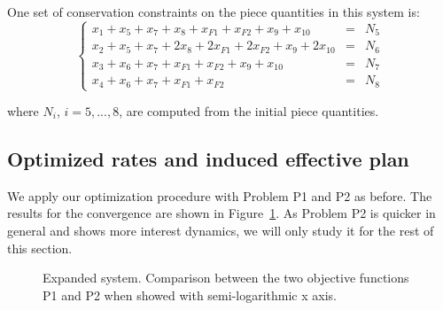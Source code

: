 
    One set of conservation constraints on the piece quantities in this system is:
    \begin{equation}\label{eq:consExp}
        \left\lbrace\begin{array}{lll}
            x_1+x_5+x_7+x_8+x_{F1}+x_{F2}+x_{9}+x_{10} &=& N_5 \\
            x_2+x_5+x_7+2 x_8+2 x_{F1}+2 x_{F2}+x_{9}+2 x_{10} &=& N_6 \\
            x_3+x_6+x_7+x_{F1}+x_{F2}+x_{9}+x_{10} &=& N_7\\
            x_4 + x_6 + x_7 + x_{F1} + x_{F2} &=& N_8
        \end{array}
        \right.
    \end{equation}

    where $N_i$, $i=5,...,8$, are computed from the initial piece
    quantities.

    \subsection{Optimized rates and induced effective plan} %
    \label{sub:optimized_rates}
        We apply our optimization procedure with Problem P1 and P2 as before. The results for the convergence are shown in Figure~\ref{fig:exp_optim_objfct_comparison}. As Problem P2 is quicker in general and shows more interest dynamics, we will only study it for the rest of this section.

            \begin{figure}[h!]
                \caption{Expanded system. Comparison between the two objective functions P1 and P2 when showed with semi-logarithmic x axis.}
            \label{fig:exp_optim_objfct_comparison} %
            \end{figure}

